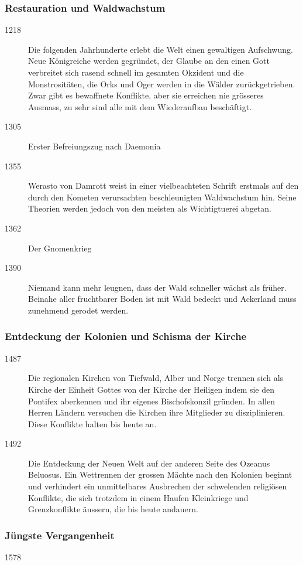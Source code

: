 \documentclass[10pt,twoside,twocolumn,openany]{book}
\begin{document}
\begin{multicols}{2}
	\subsubsection{Restauration und Waldwachstum}
	\begin{description}
		\item[1218] Die folgenden Jahrhunderte erlebt die Welt einen gewaltigen Aufschwung. Neue Königreiche werden gegründet, der Glaube an den einen Gott verbreitet sich rasend schnell im gesamten Okzident und die Monstrositäten, die Orks und Oger werden in die Wälder zurückgetrieben. Zwar gibt es bewaffnete Konflikte, aber sie erreichen nie grösseres Ausmass, zu sehr sind alle mit dem Wiederaufbau beschäftigt.
		\item[1305] Erster Befreiungszug nach Daemonia
		\item[1355] Werasto von Damrott weist in einer vielbeachteten Schrift erstmals auf den durch den Kometen verursachten beschleunigten Waldwachstum hin. Seine Theorien werden jedoch von den meisten als Wichtigtuerei abgetan.
		\item[1362] Der Gnomenkrieg
		\item[1390] Niemand kann mehr leugnen, dass der Wald schneller wächst als früher. Beinahe aller fruchtbarer Boden ist mit Wald bedeckt und Ackerland muss zunehmend gerodet werden.
		
	\end{description}
	
	\subsubsection{Entdeckung der Kolonien und Schisma der Kirche}
	\begin{description}
		\item[1487] Die regionalen Kirchen von Tiefwald, Alber und Norge trennen sich als Kirche der Einheit Gottes von der Kirche der Heiligen indem sie den Pontifex aberkennen und ihr eigenes Bischofskonzil gründen. In allen Herren Ländern versuchen die Kirchen ihre Mitglieder zu disziplinieren. Diese Konflikte halten bis heute an.
		\item[1492] Die Entdeckung der Neuen Welt auf der anderen Seite des Ozeanus Beluosus. Ein Wettrennen der grossen Mächte nach den Kolonien beginnt und verhindert ein unmittelbares Ausbrechen der schwelenden religiösen Konflikte, die sich trotzdem in einem Haufen Kleinkriege und Grenzkonflikte äussern, die bis heute andauern.
	\end{description}
	
	\subsubsection{Jüngste Vergangenheit}
	\begin{description}
		\item[1578]
		

		
		
	\end{description}
\end{multicols}
\end{document}
